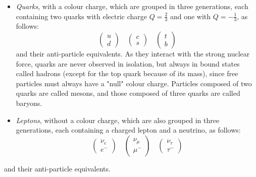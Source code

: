     \begin{itemize}
        \item \textit{Quarks}, with a colour charge, which are grouped in three generations, each containing two quarks with electric charge $Q=\frac{2}{3}$ and one with $Q=-\frac{1}{3}$, as follows:
        \begin{equation*}
            \begin{pmatrix}
                u \\
                d
            \end{pmatrix}
            \quad
            \begin{pmatrix}
                c \\
                s
            \end{pmatrix}
            \quad
            \begin{pmatrix}
                t \\
                b
            \end{pmatrix}
        \end{equation*}
        and their anti-particle equivalents. 
        As they interact with the strong nuclear force, quarks are never observed in isolation, but always in bound states called hadrons (except for the top quark because of its mass), since free particles must always have a "null" colour charge.
        Particles composed of two quarks are called mesons, and those composed of three quarks are called baryons.
        
        \item \textit{Leptons}, without a colour charge, which are also grouped in three generations, each containing a charged lepton and a neutrino, as follows:
        \begin{equation*}
            \begin{pmatrix}
                \nu_e \\
                e^-
            \end{pmatrix}
            \quad
            \begin{pmatrix}
                \nu_\mu \\
                \mu^-
            \end{pmatrix}
            \quad
            \begin{pmatrix}
                \nu_\tau \\
                \tau^-
            \end{pmatrix}
        \end{equation*}
    \end{itemize}
    and their anti-particle equivalents.

